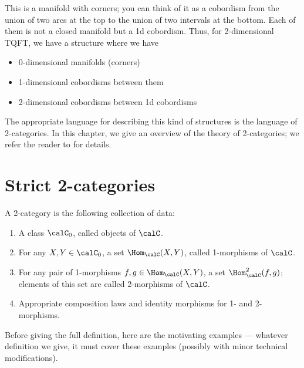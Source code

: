 This is a manifold with corners; you can think of it as a cobordism from the
union of two arcs at the top to the union of two intervals at the bottom. Each
of them is not a closed manifold but a 1d cobordism. Thus, for 2-dimensional
TQFT,  we have a structure where we have
\begin{itemize}
  \item 0-dimensional manifolds (corners)
  \item 1-dimensional cobordisms between them
  \item 2-dimensional cobordisms between 1d cobordisms
\end{itemize}

The appropriate language for describing this kind of structures is the
language of 2-categories. In this chapter, we give an overview of the theory
of 2-categories; we refer the reader to \cite{leinster} for details.

\section{Strict 2-categories}\label{s:2cat-strict}
\begin{predefinition}\label{d:2-cat-prelim}
  A 2-category is the following collection of data:
  \begin{enumerate}
    \item A class $\calC_0$, called objects of $\calC$.
    \item For any $X,Y\in \calC_0$, a set $\Hom_{\calC}(X,Y)$,
    called 1-morphisms of $\calC$.
    \item For any pair of 1-morphisms $f,g\in \Hom_\calC(X,Y)$, a set
      $\Hom^2_{\calC}(f,g)$; elements of this set are called
      2-morphisms of $\calC$.
    \item Appropriate composition laws and identity morphisms for 1-
      and 2-morphisms.
  \end{enumerate}
\end{predefinition}
Before giving the full definition, here are the motivating examples ---
whatever definition we give, it must cover these examples (possibly with minor
technical modifications).

